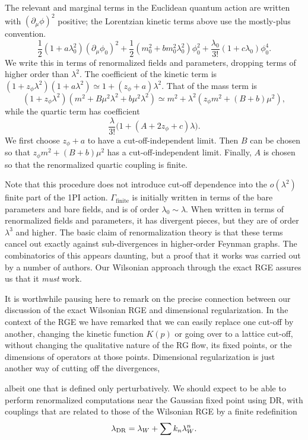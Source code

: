 The relevant and marginal terms in the Euclidean quantum action are
written with $(\partial_\mu\phi)^2$ positive; the Lorentzian kinetic terms
above use the mostly-plus convention.
\[
  \frac{1}{2}(1+a\lambda_0^2)(\partial_\mu\phi_0)^2
  +\frac{1}{2}(m_0^2+bm_0^2\lambda_0^2)\phi_0^2
  +\frac{\lambda_0}{3!}(1+c\lambda_0)\phi_0^4.
\]
We write this in terms of renormalized fields and parameters, dropping terms of
higher order than $\lambda^2$. The coefficient of the kinetic term is
$(1+z_\phi\lambda^2)(1+a\lambda^2)\simeq1+(z_\phi+a)\lambda^2$. That of the mass term is
\[
  (1+z_\phi\lambda^2)(m^2+B\mu^2\lambda^2+b\mu^2\lambda^2)
  \simeq m^2+\lambda^2(z_\phi m^2+(B+b)\mu^2),
\]
while the quartic term has coefficient
\[
  \frac{\lambda}{3!}\bigl(1+(A+2z_\phi+c)\lambda\bigr).
\]
We first choose $z_\phi+a$ to have a cut-off-independent limit. Then $B$ can be
chosen so that $z_\phi m^2+(B+b)\mu^2$ has a cut-off-independent limit. Finally, $A$
is chosen so that the renormalized quartic coupling is finite.

Note that this procedure does not introduce cut-off dependence into the
$o(\lambda^2)$ finite part of the 1PI action. $\Gamma_{\mathrm{finite}}$ is
initially written in terms of the bare parameters and bare fields, and is of
order $\lambda_0\sim\lambda$. When written in terms of renormalized fields and
parameters, it has divergent pieces, but they are of order $\lambda^3$ and
higher. The basic claim of renormalization theory is that these terms cancel out
exactly against sub-divergences in higher-order Feynman graphs. The combinatorics
of this appears daunting, but a proof that it works was carried out by a number
of authors. Our Wilsonian approach through the exact RGE assures us that it
\emph{must} work.

It is worthwhile pausing here to remark on the precise connection between our
discussion of the exact Wilsonian RGE and dimensional regularization. In the
context of the RGE we have remarked that we can easily replace one cut-off by
another, changing the kinetic function $K(p)$ or going over to a lattice cut-off,
without changing the qualitative nature of the RG flow, its fixed points, or the
dimensions of operators at those points. Dimensional regularization is just
another way of cutting off the divergences,

albeit one that is defined only perturbatively. We should expect to be able to
perform renormalized computations near the Gaussian fixed point using DR, with
couplings that are related to those of the Wilsonian RGE by a finite
redefinition
\[
  \lambda_{\rm DR}=\lambda_W+\sum k_n\lambda_W^n.
\]

